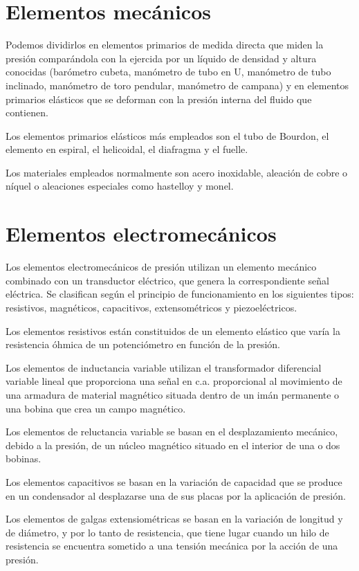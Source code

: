 \section{Elementos mecánicos}
Podemos dividirlos en elementos primarios de medida directa que miden la presión comparándola con la ejercida por un líquido de densidad y altura conocidas (barómetro cubeta, manómetro de tubo en U, manómetro de tubo inclinado, manómetro de toro pendular, manómetro de campana) y en elementos primarios elásticos que se deforman con la presión interna del fluido que contienen.

Los elementos primarios elásticos más empleados son el tubo de Bourdon, el elemento en espiral, el helicoidal, el diafragma y el fuelle.

Los materiales empleados normalmente son acero inoxidable, aleación de cobre o níquel o aleaciones especiales como hastelloy y monel.

\section{Elementos electromecánicos}
Los elementos electromecánicos de presión utilizan un elemento mecánico combinado con un transductor eléctrico, que genera la correspondiente señal eléctrica. Se clasifican según el principio de funcionamiento en los siguientes tipos: resistivos, magnéticos, capacitivos, extensométricos y piezoeléctricos.

Los elementos resistivos están constituidos de un elemento elástico que varía la resistencia óhmica de un potenciómetro en función de la presión.

Los elementos de inductancia variable utilizan el transformador diferencial variable lineal que proporciona una señal en c.a. proporcional al movimiento de una armadura de material magnético situada dentro de un imán permanente o una bobina que crea un campo magnético.

Los elementos de reluctancia variable se basan en el desplazamiento mecánico, debido a la presión, de un núcleo magnético situado en el interior de una o dos bobinas.

Los elementos capacitivos se basan en la variación de capacidad que se produce en un condensador al desplazarse una de sus placas por la aplicación de presión.

Los elementos de galgas extensiométricas se basan en la variación de longitud y de diámetro, y por lo tanto de resistencia, que tiene lugar cuando un hilo de resistencia se encuentra sometido a una tensión mecánica por la acción de una presión.

